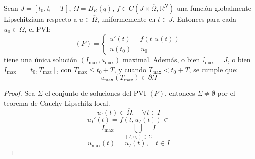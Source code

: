 \begin{teorema}
    Sean $J = [t_0, t_0 + T]$, $\Omega = B_R(q)$, $f \in C(J \times \overline{\Omega}, \mathbb{R}^N)$ una función globalmente Lipschitziana respecto a $u \in \overline{\Omega}$, uniformemente en $t \in J$. Entonces para cada $u_0 \in \Omega$, el PVI:
    \[
        (P) =
        \begin{cases}
            u'(t) = f(t, u(t)) \\
            u(t_0) = u_0
        \end{cases}
    \]
    tiene una única solución $(I_{\text{max}}, u_{\text{max}})$ maximal. Además, o bien $I_{\text{max}} = J$, o bien $I_{\text{max}} = [t_0, T_{\text{max}}]$, con $T_{\text{max}} \leq t_0 + T$, y cuando $T_{\text{max}} < t_0 + T$, se cumple que:
    \[
        u_{\text{max}}(T_{\text{max}}) \in \partial \Omega
    \]
\end{teorema}

\begin{proof}
    Sea $\Sigma$ el conjunto de soluciones del PVI $(P)$, entonces $\Sigma \neq \emptyset$ por el teorema de Cauchy-Lipschitz local.
    \[
        u_I(t) \in \overline{\Omega}, \quad \forall t \in I
    \]
    \[
        u_I'(t) = f(t, u_I(t)) \in 
    \]
    \[
        I_{\text{max}} = \bigcup_{(I, u_I) \in \Sigma} I
    \]
    \[
        u_{\text{max}}(t) = u_I(t), \quad t \in I
    \]
\end{proof}
